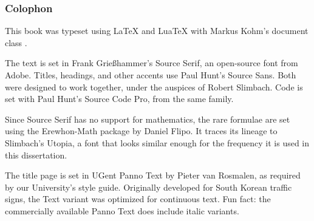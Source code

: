 \documentclass[main]{subfiles}
\begin{document}
\vspace*{\fill}

\begin{small}
    \subsubsection*{Colophon}

    This book was typeset using {\LaTeX} and {Lua\TeX} with Markus Kohm's document class {\KOMAScript}.

    The text is set in Frank Grießhammer's Source Serif, an open-source font from Adobe.
    Titles, headings, and other accents use Paul Hunt's {\sffamily Source Sans}.
    Both were designed to work together, under the auspices of Robert Slimbach.
    Code is set with Paul Hunt's {\ttfamily Source Code Pro}, from the same family.

    Since Source Serif has no support for mathematics,
    the rare formulae are set using the Erewhon-Math package by Daniel Flipo.
    It traces its lineage to Slimbach's Utopia,
    a font that looks similar enough for the frequency it is used in this dissertation.

    The title page is set in {\panno\selectfont UGent Panno Text} by Pieter van Rosmalen,
    as required by our University's style guide.
    Originally developed for South Korean traffic signs, the Text variant was optimized for continuous text.
    Fun fact: the commercially available Panno Text does include italic variants.
\end{small}
\end{document}
